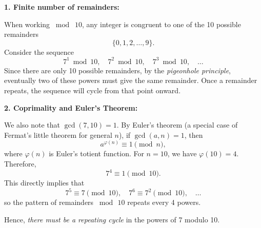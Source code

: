 \documentclass[12pt]{article}
\theoremstyle{definition} %
\theoremstyle{plain} %
\begin{document}
\textbf{1. Finite number of remainders:}

When working \(\bmod\; 10\), any integer is congruent to one of the 10 possible remainders 
\[
\{0,1,2,\dots,9\}.
\]
Consider the sequence
\[
7^1 \bmod 10,\quad 7^2 \bmod 10,\quad 7^3 \bmod 10,\quad \dots
\]
Since there are only 10 possible remainders, by the \textit{pigeonhole principle}, eventually two of these powers must give the same remainder. Once a remainder repeats, the sequence will cycle from that point onward.

\textbf{2. Coprimality and Euler's Theorem:}

We also note that \(\gcd(7,10) = 1\). By Euler's theorem (a special case of Fermat's little theorem for general \(n\)), if \(\gcd(a,n)=1\), then
\[
a^{\varphi(n)} \equiv 1 \pmod{n},
\]
where \(\varphi(n)\) is Euler's totient function. For \(n=10\), we have \(\varphi(10) = 4\). Therefore,
\[
7^4 \equiv 1 \pmod{10}.
\]
This directly implies that
\[
7^5 \equiv 7 \pmod{10}, \quad 7^6 \equiv 7^2 \pmod{10}, \quad \ldots
\]
so the pattern of remainders \(\bmod\,10\) repeats every 4 powers.

Hence, \emph{there must be a repeating cycle} in the powers of 7 modulo 10.
\end{document}
